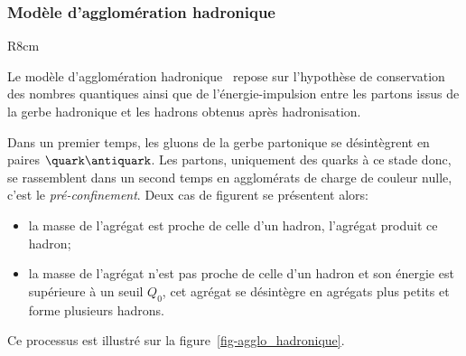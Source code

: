 \subsubsection{Modèle d'agglomération hadronique}\label{chapter-JERC-section-jets-subsec-hadronisation-subsubsec-agglo_hadronique}
\begin{wrapfigure}{R}{8cm}
\centering

\caption[Formation de jets dans le cadre du modèle d'agglomération hadronique.]{Schématisation de l'hadronisation dans le cadre du modèle d'agglomération hadronique.}
\label{fig-agglo_hadronique}
\end{wrapfigure}
Le modèle d'agglomération hadronique~\cite{Winter_2004} repose sur l'hypothèse de conservation des nombres quantiques ainsi que de l'énergie-impulsion entre les partons issus de la gerbe hadronique et les hadrons obtenus après hadronisation.
\par Dans un premier temps, les gluons de la gerbe partonique se désintègrent en paires $\quark\antiquark$. Les partons, uniquement des quarks à ce stade donc, se rassemblent dans un second temps en agglomérats de charge de couleur nulle, c'est le \emph{pré-confinement}.
Deux cas de figurent se présentent alors:
\begin{itemize}
\item la masse de l'agrégat est proche de celle d'un hadron, l'agrégat produit ce hadron;
\item la masse de l'agrégat n'est pas proche de celle d'un hadron et son énergie est supérieure à un seuil $Q_0$, cet agrégat se désintègre en agrégats plus petits et forme plusieurs hadrons.
\end{itemize}
Ce processus est illustré sur la figure~\ref{fig-agglo_hadronique}.
